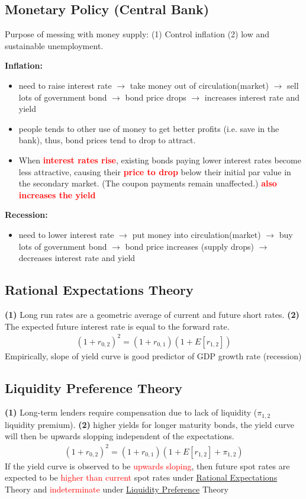 \begin{multicols}{2}
\subsection{Monetary Policy (Central Bank)}
Purpose of messing with money supply: (1) Control inflation (2) low and sustainable unemployment. \par
\textbf{Inflation:}
\begin{itemize}
    \item need to raise interest rate $\rightarrow$ take money out of circulation(market) $\rightarrow$ sell lots of government bond $\rightarrow$ bond price drops 
    $\rightarrow$ increases interest rate and yield 
    \item people tends to other use of money to get better profits (i.e. save in the bank), thus, bond prices tend to drop to attract.
    \item When \textcolor{red}{\textbf{interest rates rise}}, existing bonds paying lower interest rates become less attractive, causing their \textcolor{red}{\textbf{price to drop}} below their initial par value in the secondary market. (The coupon payments remain unaffected.) \textcolor{red}{\textbf{also increases the yield}}
    
\end{itemize}
\textbf{Recession:}
\begin{itemize}
    \item need to lower interest rate $\rightarrow$ put money into circulation(market) $\rightarrow$ buy lots of government bond $\rightarrow$ bond price increases (supply drops) $\rightarrow$ decreases interest rate and yield 
\end{itemize}

\subsection{Rational Expectations Theory}
\textbf{(1)} Long run rates are a geometric average of current and future short rates. \textbf{(2)} The expected future interest rate is equal to the forward rate.
\begin{gather*}
    (1+r_{0,2})^2 = (1+r_{0,1})(1+E[r_{1,2}])
\end{gather*}
Empirically, slope of yield curve is good predictor of GDP growth rate (recession)

\subsection{Liquidity Preference Theory}
\textbf{(1)} Long-term lenders require compensation due to lack of liquidity ($\pi_{1,2}$ liquidity premium). \textbf{(2)} higher yields for longer maturity bonds, the yield curve will then be upwards slopping independent of the expectations. 
\begin{gather*}
    (1+r_{0,2})^2 = (1+r_{0,1})(1+E[r_{1,2}]+\pi_{1,2})
\end{gather*}
If the yield curve is observed to be \textcolor{red}{upwards sloping}, then future spot rates are expected to be \textcolor{red}{higher than current} spot rates under \underline{Rational Expectations} Theory and \textcolor{red}{indeterminate} under \underline{Liquidity Preference} Theory

\end{multicols}
